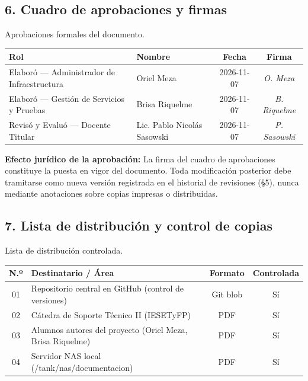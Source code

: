 \documentclass[10pt,a4paper]{article}
\begin{document}
\subsection*{6. Cuadro de aprobaciones y firmas}
Aprobaciones formales del documento.

\begin{table}[htbp]
\centering
\small
\begin{tabular}{|p{6.5cm}|p{3.5cm}|c|c|}
\hline
\textbf{\textsf{Rol}} & \textbf{\textsf{Nombre}} & \textbf{\textsf{Fecha}} & \textbf{\textsf{Firma}} \\
\hline
Elaboró — Administrador de Infraestructura & Oriel Meza & 2026-11-07 & \textit{O. Meza} \\
\hline
Elaboró — Gestión de Servicios y Pruebas & Brisa Riquelme & 2026-11-07 & \textit{B. Riquelme} \\
\hline
Revisó y Evaluó — Docente Titular & Lic. Pablo Nicolás Sasowski & 2026-11-07 & \textit{P. Sasowski} \\
\hline
\end{tabular}
\end{table}

\begin{normativabox}{}
\textbf{Efecto jurídico de la aprobación:} La firma del cuadro de aprobaciones constituye la puesta en vigor del documento. Toda modificación posterior debe tramitarse como nueva versión registrada en el historial de revisiones (§5), nunca mediante anotaciones sobre copias impresas o distribuidas.
\end{normativabox}

\subsection*{7. Lista de distribución y control de copias}
Lista de distribución controlada.

\begin{table}[htbp]
\centering
\small
\begin{tabular}{|c|p{8.5cm}|c|c|}
\hline
\textbf{\textsf{N.º}} & \textbf{\textsf{Destinatario / Área}} & \textbf{\textsf{Formato}} & \textbf{\textsf{Controlada}} \\
\hline
01 & Repositorio central en GitHub (control de versiones) & Git blob & Sí \\
\hline
02 & Cátedra de Soporte Técnico II (IESETyFP) & PDF & Sí \\
\hline
03 & Alumnos autores del proyecto (Oriel Meza, Brisa Riquelme) & PDF & Sí \\
\hline
04 & Servidor NAS local (/tank/nas/documentacion) & PDF & Sí \\
\hline
\end{tabular}
\end{table}
\end{document}
